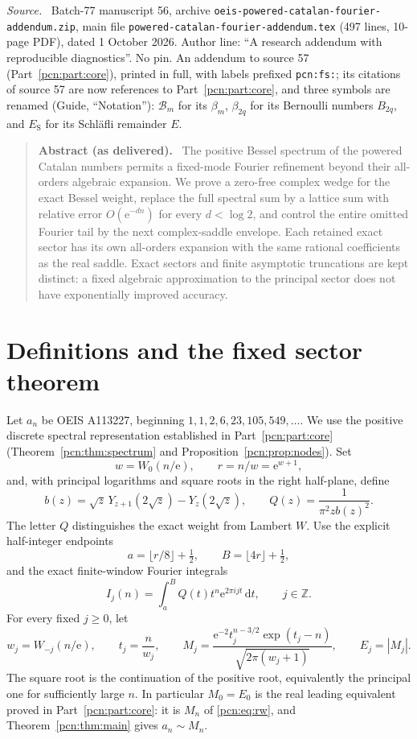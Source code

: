 \documentclass[11pt,letterpaper]{article}
\theoremstyle{remark}\newtheorem{remark}[theorem]{Remark}
\newcommand{\dd}{\,\mathrm d}
\newcommand{\ee}{\mathrm e}
\newenvironment{partsource}{\par\medskip\noindent\begin{minipage}{\linewidth}\small\raggedright\textit{Source.}\ }{\end{minipage}\par\medskip}
\newenvironment{partabstract}{\par\begin{quote}\small\textbf{Abstract (as delivered).}\ }{\end{quote}\par}
\begin{document}
\begin{partsource}
Batch-77 manuscript 56, archive \texttt{oeis-powered-catalan-fourier-addendum.zip}, main file \texttt{powered-catalan-fourier-addendum.tex} (497 lines, 10-page PDF), dated 1 October 2026. Author line: ``A research addendum with reproducible diagnostics''. No pin. An addendum to source 57 (Part~\ref{pcn:part:core}), printed in full, with labels prefixed \texttt{pcn:fs:}; its citations of source 57 are now references to Part~\ref{pcn:part:core}, and three symbols are renamed (Guide, ``Notation''): $\mathcal B_m$ for its $\beta_m$, $\beta_{2q}$ for its Bernoulli numbers $B_{2q}$, and $E_{\mathrm S}$ for its Schl\"afli remainder $E$.
\end{partsource}

\begin{partabstract}
The positive Bessel spectrum of the powered Catalan numbers permits a fixed-mode Fourier refinement beyond their all-orders algebraic expansion. We prove a zero-free complex wedge for the exact Bessel weight, replace the full spectral sum by a lattice sum with relative error $O(\ee^{-dn})$ for every $d<\log2$, and control the entire omitted Fourier tail by the next complex-saddle envelope. Each retained exact sector has its own all-orders expansion with the same rational coefficients as the real saddle. Exact sectors and finite asymptotic truncations are kept distinct: a fixed algebraic approximation to the principal sector does not have exponentially improved accuracy.
\end{partabstract}

\section{Definitions and the fixed sector theorem}
Let $a_n$ be OEIS A113227, beginning $1,1,2,6,23,105,549,\ldots$. We use the positive discrete spectral representation established in Part~\ref{pcn:part:core} (Theorem~\ref{pcn:thm:spectrum} and Proposition~\ref{pcn:prop:nodes}). Set
\[
 w=W_0(n/\ee),\qquad r=n/w=\ee^{w+1},
\]
and, with principal logarithms and square roots in the right half-plane, define
\[
 b(z)=\sqrt z\,Y_{z+1}(2\sqrt z)-Y_z(2\sqrt z),\qquad
 Q(z)=\frac1{\pi^2z b(z)^2}.
\]
The letter $Q$ distinguishes the exact weight from Lambert $W$. Use the explicit half-integer endpoints
\[
 a=\lfloor r/8\rfloor+\tfrac12,\qquad
 B=\lfloor4r\rfloor+\tfrac12,
\]
and the exact finite-window Fourier integrals
\begin{equation}\label{pcn:fs:eq:sectors}
 I_j(n)=\int_a^B Q(t)t^n\ee^{2\pi ijt}\dd t,
 \qquad j\in\mathbb Z.
\end{equation}
For every fixed $j\ge0$, let
\begin{equation}\label{pcn:fs:eq:saddles}
 w_j=W_{-j}(n/\ee),\qquad t_j=\frac n{w_j},\qquad
 M_j=\frac{\ee^{-2}t_j^{n-3/2}\exp(t_j-n)}
                 {\sqrt{2\pi(w_j+1)}},\qquad E_j=|M_j|.
\end{equation}
The square root is the continuation of the positive root, equivalently the principal one for sufficiently large $n$. In particular $M_0=E_0$ is the real leading equivalent proved in Part~\ref{pcn:part:core}: it is $M_n$ of \eqref{pcn:eq:rw}, and Theorem~\ref{pcn:thm:main} gives $a_n\sim M_n$.
\end{document}
